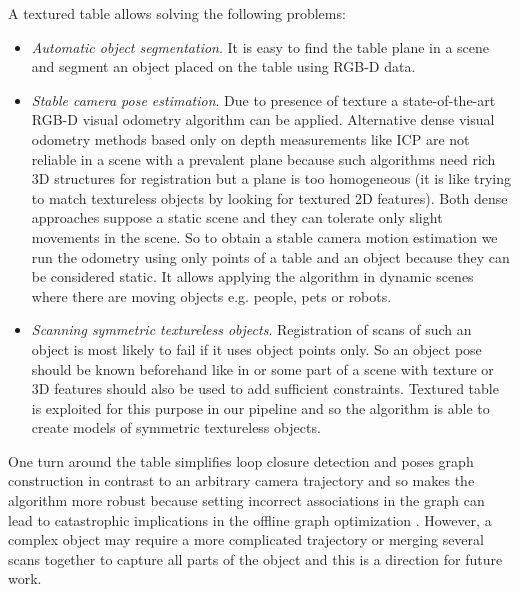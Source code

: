 \documentclass[letterpaper, 10 pt, conference]{ieeeconf}  %
\begin{document}
A textured table allows solving the following problems:

\begin{itemize}

\item \textit{Automatic object segmentation}. It is easy to find the table plane
in a scene and segment an object placed on the table using RGB-D data.
\item \textit{Stable camera pose estimation}. Due to presence of texture
a state-of-the-art RGB-D visual odometry algorithm can be applied.
Alternative dense visual odometry methods based only on depth measurements
like ICP are not reliable in a scene with a prevalent plane \cite{rusinkiewicz2002real}
because such algorithms need rich 3D structures for registration but a plane is too homogeneous
(it is like trying to match textureless objects by looking for textured 2D features).
Both dense approaches
suppose a static scene and they can tolerate only slight movements in the scene.
So to obtain a stable camera motion estimation we run the odometry using only
points of a table and an object because they can be considered static.
It allows applying the algorithm in dynamic scenes where there are moving objects e.g. people, pets or robots.
\item \textit{Scanning symmetric textureless objects}. Registration of scans of such an object
is most likely to fail if it uses object points only. So an object pose should be known beforehand like in \cite{krainin2011manipulator}
or some part of a scene with
texture or 3D features should also be used to add sufficient constraints.
Textured table is exploited for this purpose in our pipeline
and so the algorithm is able to create models of symmetric textureless objects.
\end{itemize}


One turn around the table simplifies loop closure detection and poses graph construction
in contrast to an arbitrary camera trajectory
and so makes the algorithm more robust because setting incorrect associations
in the graph can lead to catastrophic implications in the offline graph
optimization \cite{sunderhauf2012switchable}.
However, a complex object may require a more complicated trajectory
or merging several scans together to capture all parts of the object %
and this is a direction for future work.
\end{document}
